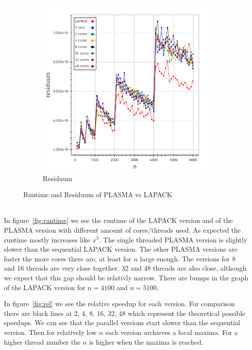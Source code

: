 \documentclass[a4paper,final,ngerman,english]{article}
\begin{document}
\begin{figure}[h!]
\begin{subfigure}{0.46\textwidth}
		\includegraphics[width=\textwidth]{res}
		\caption{Residuum}
\label{fig:residuum}
	\end{subfigure}
	\caption{Runtime and Residuum of PLASMA vs LAPACK}
\end{figure}

\ \\
In figure~\ref{fig:runtime}
we see the runtime of the LAPACK version and of the PLASMA version with different amount of cores/threads used.
As expected the runtime mostly increases like \(x^3\).
The single threaded PLASMA version is slightly slower than the sequential LAPACK version.
The other PLASMA versions are faster the more cores there are, at least for $n$ large enough.
The versions for 8 and 16 threads are very close together. 32 and 48 threads are also close, although
we expect that this gap should be relativly narrow.
There are bumps in the graph of the LAPACK version for \(n = 4100\) and \(n = 5100 \).

In figure~\ref{fig:rel}
we see the relative speedup for each version.
For comparison there are black lines at 2, 4, 8, 16, 32, 48 which represent the theoretical possible speedups.
We can see that the parallel versions start slower than the sequential version.
Then for relatively low $n$ each version archieves a local maxima.
For a higher thread number the $n$ is higher when the maxima is reached. 
\end{document}

